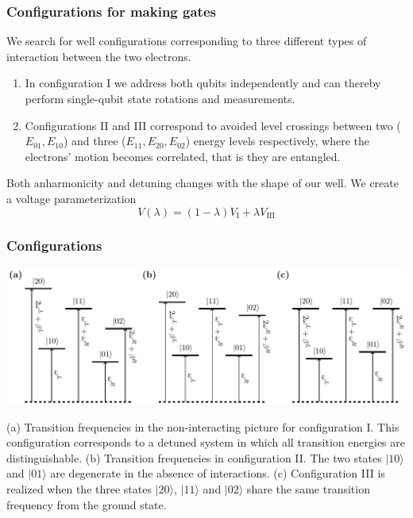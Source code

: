 \documentclass{beamer}
\begin{document}
\begin{frame}
\frametitle{Configurations for making gates}
We search for well configurations corresponding to three different types of interaction between the two electrons.

\begin{enumerate}
\item In configuration I we address both qubits independently and can thereby perform single-qubit state rotations and measurements.

\item Configurations II and III correspond to avoided level crossings between two ($E_{01}, E_{10}$) and three ($E_{11}, E_{20}, E_{02}$) energy levels respectively, where the electrons' motion becomes correlated, that is they are entangled. 
\end{enumerate}

\noindent
Both anharmonicity and detuning changes with the shape of our well.
We create a voltage parameterization
\begin{equation}
V(\lambda) = (1-\lambda)V_\mathrm{I} + \lambda V_\mathrm{III}
\end{equation}
\end{frame}

\begin{frame}
\frametitle{Configurations}
\centerline{\includegraphics[width=0.8\linewidth]{qcfigures/states.pdf}}
(a) Transition frequencies in the non-interacting picture for configuration I. This configuration corresponds to a detuned
system in which all transition energies are distinguishable. (b) Transition
frequencies in configuration II. The two states $\vert 10\rangle$ and $\vert 01\rangle$ are degenerate in the
absence of interactions. (c)
Configuration III is realized when the three states $\vert 20\rangle$, $\vert 11\rangle$ and $\vert 02\rangle$ share the same transition frequency from the ground
state. 
\end{frame}
\end{document}
